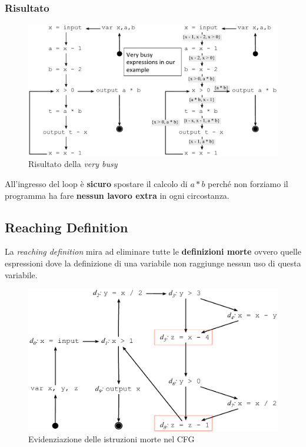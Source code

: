 \subsubsection{Risultato}
\begin{figure}[H]
  \centering
  \includegraphics[scale=0.4]{res/image/example_very-busy}
  \caption{Risultato della \textit{very busy}}
  \label{img:example_very-busy}
\end{figure}

All'ingresso del loop \`e \textbf{sicuro} spostare il calcolo di $a*b$ perch\'e
non forziamo il programma ha fare \textbf{nessun lavoro extra} in ogni
circostanza.

\subsection{Reaching Definition}
La \textit{reaching definition} mira ad eliminare tutte le \textbf{definizioni
morte} ovvero quelle espressioni dove la definizione di una variabile non
raggiunge nessun uso di questa variabile.

\begin{figure}[H]
  \centering
  \includegraphics[scale=0.4]{res/image/dead_definition}
  \caption{Evidenziazione delle istruzioni morte nel CFG}
  \label{img:dead_definition}
\end{figure}

